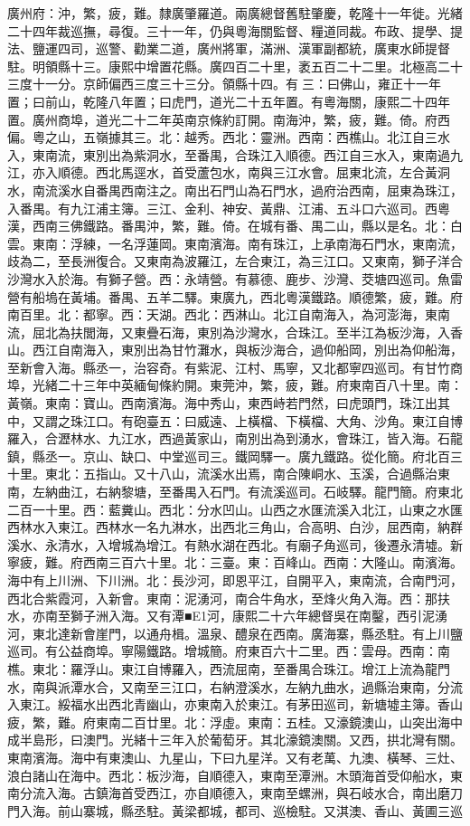 \begin{pinyinscope}
廣州府：沖，繁，疲，難。隸廣肇羅道。兩廣總督舊駐肇慶，乾隆十一年徙。光緒二十四年裁巡撫，尋復。三十一年，仍與粵海關監督、糧道同裁。布政、提學、提法、鹽運四司，巡警、勸業二道，廣州將軍，滿洲、漢軍副都統，廣東水師提督駐。明領縣十三。康熙中增置花縣。廣四百二十里，袤五百二十二里。北極高二十三度十一分。京師偏西三度三十三分。領縣十四。有三：曰佛山，雍正十一年置；曰前山，乾隆八年置；曰虎門，道光二十五年置。有粵海關，康熙二十四年置。廣州商埠，道光二十二年英南京條約訂開。南海沖，繁，疲，難。倚。府西偏。粵之山，五嶺據其三。北：越秀。西北：靈洲。西南：西樵山。北江自三水入，東南流，東別出為紫洞水，至番禺，合珠江入順德。西江自三水入，東南過九江，亦入順德。西北馬逕水，首受蘆包水，南與三江水會。屈東北流，左合黃洞水，南流溪水自番禺西南注之。南出石門山為石門水，過府治西南，屈東為珠江，入番禺。有九江浦主簿。三江、金利、神安、黃鼎、江浦、五斗口六巡司。西粵漢，西南三佛鐵路。番禺沖，繁，難。倚。在城有番、禺二山，縣以是名。北：白雲。東南：浮練，一名浮蓮岡。東南濱海。南有珠江，上承南海石門水，東南流，歧為二，至長洲復合。又東南為波羅江，左合東江，為三江口。又東南，獅子洋合沙灣水入於海。有獅子營。西：永靖營。有慕德、鹿步、沙灣、茭塘四巡司。魚雷營有船塢在黃埔。番禺、五羊二驛。東廣九，西北粵漢鐵路。順德繁，疲，難。府南百里。北：都寧。西：天湖。西北：西淋山。北江自南海入，為河澎海，東南流，屈北為扶閭海，又東疊石海，東別為沙灣水，合珠江。至半江為板沙海，入香山。西江自南海入，東別出為甘竹灘水，與板沙海合，過仰船岡，別出為仰船海，至新會入海。縣丞一，治容奇。有紫泥、江村、馬寧，又北都寧四巡司。有甘竹商埠，光緒二十三年中英緬甸條約開。東莞沖，繁，疲，難。府東南百八十里。南：黃嶺。東南：寶山。西南濱海。海中秀山，東西峙若門然，曰虎頭門，珠江出其中，又謂之珠江口。有砲臺五：曰威遠、上橫檔、下橫檔、大角、沙角。東江自博羅入，合瀝林水、九江水，西過黃家山，南別出為到湧水，會珠江，皆入海。石龍鎮，縣丞一。京山、缺口、中堂巡司三。鐵岡驛一。廣九鐵路。從化簡。府北百三十里。東北：五指山。又十八山，流溪水出焉，南合陳峒水、玉溪，合過縣治東南，左納曲江，右納黎塘，至番禺入石門。有流溪巡司。石岐驛。龍門簡。府東北二百一十里。西：藍糞山。西北：分水凹山。山西之水匯流溪入北江，山東之水匯西林水入東江。西林水一名九淋水，出西北三角山，合高明、白沙，屈西南，納群溪水、永清水，入增城為增江。有熱水湖在西北。有廟子角巡司，後遷永清墟。新寧疲，難。府西南三百六十里。北：三臺。東：百峰山。西南：大隆山。南濱海。海中有上川洲、下川洲。北：長沙河，即恩平江，自開平入，東南流，合南門河，西北合紫霞河，入新會。東南：泥湧河，南合牛角水，至烽火角入海。西：那扶水，亦南至獅子洲入海。又有潭■E1河，康熙二十六年總督吳在南鑿，西引泥湧河，東北達新會崖門，以通舟楫。溫泉、醴泉在西南。廣海寨，縣丞駐。有上川鹽巡司。有公益商埠。寧陽鐵路。增城簡。府東百六十二里。西：雲母。西南：南樵。東北：羅浮山。東江自博羅入，西流屈南，至番禺合珠江。增江上流為龍門水，南與派潭水合，又南至三江口，右納澄溪水，左納九曲水，過縣治東南，分流入東江。綏福水出西北青幽山，亦東南入於東江。有茅田巡司，新塘墟主簿。香山疲，繁，難。府東南二百廿里。北：浮虛。東南：五桂。又濠鏡澳山，山突出海中成半島形，曰澳門。光緒十三年入於葡萄牙。其北濠鏡澳關。又西，拱北灣有關。東南濱海。海中有東澳山、九星山，下曰九星洋。又有老萬、九澳、橫琴、三灶、浪白諸山在海中。西北：板沙海，自順德入，東南至潭洲。木頭海首受仰船水，東南分流入海。古鎮海首受西江，亦自順德入，東南至螺洲，與石岐水合，南出磨刀門入海。前山寨城，縣丞駐。黃梁都城，都司、巡檢駐。又淇澳、香山、黃圃三巡
\end{pinyinscope}

